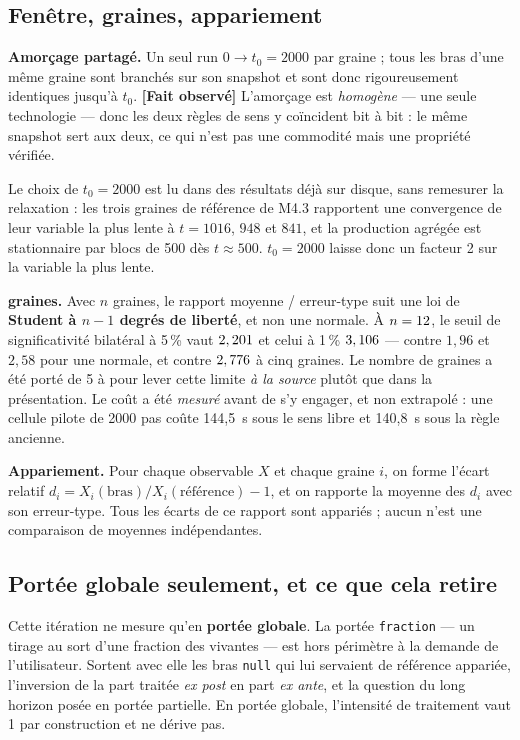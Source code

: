 \documentclass[11pt,a4paper]{article}
\newcommand{\code}[1]{\texttt{#1}}
\newcommand{\fait}{\textbf{[Fait observé]}}
\begin{document}
\subsection{Fenêtre, graines, appariement}

\textbf{Amorçage partagé.} Un seul run $0 \to t_0 = 2000$ par graine ; tous les
bras d'une même graine sont branchés sur son snapshot et sont donc
rigoureusement identiques jusqu'à $t_0$. \fait{} L'amorçage est \emph{homogène}
--- une seule technologie --- donc les deux règles de sens y coïncident bit à
bit : le même snapshot sert aux deux, ce qui n'est pas une commodité mais une
propriété vérifiée.

Le choix de $t_0 = 2000$ est lu dans des résultats déjà sur disque, sans
remesurer la relaxation : les trois graines de référence de M4.3 rapportent une
convergence de leur variable la plus lente à $t = 1016$, $948$ et $841$, et la
production agrégée est stationnaire par blocs de 500 dès $t \approx 500$.
$t_0 = 2000$ laisse donc un facteur 2 sur la variable la plus lente.

\textbf{\nSeeds{} graines.} Avec $n$ graines, le rapport
moyenne / erreur-type suit une loi de \textbf{Student à $n-1$ degrés de
liberté}, et non une normale. À $n = 12{}$, le seuil de significativité
bilatéral à 5\,\% vaut $2,201$ et celui à 1\,\%
$3,106$ --- contre $1{,}96$ et $2{,}58$ pour une normale, et contre
$2,776$ à cinq graines. Le nombre de graines a été porté de 5 à
\nSeeds{} pour lever cette limite \emph{à la source} plutôt que dans la
présentation. Le coût a été \emph{mesuré} avant de s'y engager, et non
extrapolé : une cellule pilote de 2000 pas coûte 144,5~s sous le
sens libre et 140,8~s sous la règle ancienne.

\textbf{Appariement.} Pour chaque observable $X$ et chaque graine $i$, on forme
l'écart relatif $d_i = X_i(\text{bras}) / X_i(\text{référence}) - 1$, et on
rapporte la moyenne des $d_i$ avec son erreur-type. Tous les écarts de ce
rapport sont appariés ; aucun n'est une comparaison de moyennes indépendantes.

\subsection{Portée globale seulement, et ce que cela retire}

Cette itération ne mesure qu'en \textbf{portée globale}. La portée
\code{fraction} --- un tirage au sort d'une fraction des vivantes --- est hors
périmètre à la demande de l'utilisateur. Sortent avec elle les bras
\code{null} qui lui servaient de référence appariée, l'inversion de la part
traitée \emph{ex post} en part \emph{ex ante}, et la question du long horizon
posée en portée partielle. En portée globale, l'intensité de traitement vaut 1
par construction et ne dérive pas.
\end{document}
